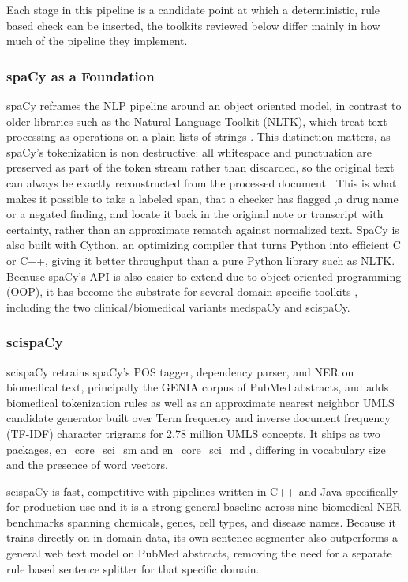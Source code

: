 \documentclass[11pt,a4paper]{article}
\begin{document}
 Each stage in this pipeline is a candidate point at which a deterministic, rule based check can be inserted, the toolkits reviewed below differ mainly in how much of the pipeline they implement.

 \subsubsection{spaCy as a Foundation}
 \label{sec:spaCy as a Foundation}

 spaCy \cite{honnibal2017spacy} reframes the NLP pipeline around an object oriented model, in contrast to older libraries such as the Natural Language Toolkit (NLTK), which treat text processing  as operations on a plain lists of strings \cite{bird2009natural} . This distinction matters, as  spaCy's tokenization is non destructive: all whitespace and punctuation are preserved as part of the token stream rather than discarded, so the original text can always be exactly reconstructed from the processed document \cite{eyre2021launching} . This is  what makes it possible to take a labeled span, that a checker has flagged ,a drug name or a negated finding, and locate it back in the original note or transcript with certainty, rather than an approximate rematch against normalized text. SpaCy is also built with Cython, an optimizing compiler that turns Python into efficient C or C++, giving it  better throughput than a pure Python library such as NLTK. Because spaCy's API is also  easier to extend due to object-oriented programming (OOP), it has become the substrate for several domain specific toolkits , including the two clinical/biomedical variants medspaCy and scispaCy.

 \subsubsection{scispaCy}
 \label{sec:scispaCy}

scispaCy \cite{neumann2019scispacy} retrains spaCy's POS tagger, dependency parser, and NER on biomedical text, principally the GENIA corpus of PubMed abstracts, and adds biomedical tokenization rules as well as an approximate nearest neighbor UMLS candidate generator built over Term frequency and inverse document frequency (TF-IDF)  character trigrams for 2.78 million UMLS concepts.
It ships as two packages, en\_core\_sci\_sm and en\_core\_sci\_md , differing in vocabulary size and the presence of word vectors.

scispaCy is fast, competitive with pipelines written in C++ and Java specifically for production use \cite{neumann2019scispacy}  and it is a strong general baseline across nine biomedical NER benchmarks spanning chemicals, genes, cell types, and disease names. Because it trains directly on in domain data, its own sentence segmenter also outperforms a general web text model on PubMed abstracts, removing the need for a separate rule based sentence splitter for that specific domain. 
\end{document}
